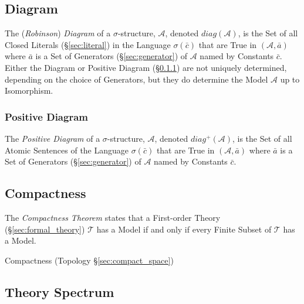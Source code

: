 \subsection{Diagram}\label{sec:diagram}

The (\emph{Robinson}) \emph{Diagram} of a $\sigma$-structure,
$\mathcal{A}$, denoted $diag(\mathcal{A})$, is the Set of all Closed
Literals (\S\ref{sec:literal}) in the Language $\sigma(\bar{c})$ that
are True in $(\mathcal{A}, \bar{a})$ where $\bar{a}$ is a Set of
Generators (\S\ref{sec:generator}) of $\mathcal{A}$ named by Constants
$\bar{c}$. Either the Diagram or Positive Diagram
(\S\ref{sec:positive_diagram}) are not uniquely determined, depending
on the choice of Generators, but they do determine the Model
$\mathcal{A}$ up to Isomorphism.



\subsubsection{Positive Diagram}\label{sec:positive_diagram}

The \emph{Positive Diagram} of a $\sigma$-structure, $\mathcal{A}$,
denoted $diag^+(\mathcal{A})$, is the Set of all Atomic Sentences of
the Language $\sigma(\bar{c})$ that are True in $(\mathcal{A},
\bar{a})$ where $\bar{a}$ is a Set of Generators
(\S\ref{sec:generator}) of $\mathcal{A}$ named by Constants $\bar{c}$.



\subsection{Compactness}\label{sec:compactness}

The \emph{Compactness Theorem} states that a First-order Theory
(\S\ref{sec:formal_theory}) $\mathcal{T}$ has a Model if and only if
every Finite Subset of $\mathcal{T}$ has a Model.

Compactness (Topology \S\ref{sec:compact_space})



\subsection{Theory Spectrum}\label{sec:theory_spectrum}

